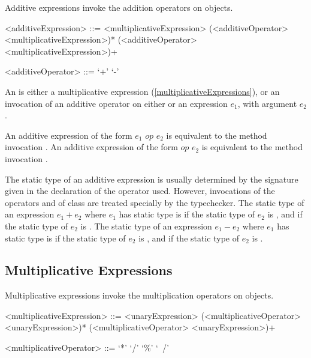 \documentclass[makeidx]{article}
\begin{document}
\LMHash{}%
Additive expressions invoke the addition operators on objects.

\begin{grammar}
<additiveExpression> ::= <multiplicativeExpression>
  \gnewline{} (<additiveOperator> <multiplicativeExpression>)*
  \alt \SUPER{} (<additiveOperator> <multiplicativeExpression>)+

<additiveOperator> ::= `+'
  \alt `-'
\end{grammar}

\LMHash{}%
An  is either a multiplicative expression (\ref{multiplicativeExpressions}), or an invocation of an additive operator on either \SUPER{} or an expression $e_1$, with argument $e_2$.

\LMHash{}%
An additive expression of the form $e_1$ $op$ $e_2$ is equivalent to the method invocation .
An additive expression of the form \SUPER{} $op$ $e_2$ is equivalent to the method invocation .

\LMHash{}%
The static type of an additive expression is usually determined by the signature given in the declaration of the operator used.
However, invocations of the operators \code{+} and \code{-} of class  are treated specially by the typechecker.
The static type of an expression $e_1 + e_2$ where $e_1$ has static type  is  if the static type of $e_2$ is , and  if the static type of $e_2$ is .
The static type of an expression $e_1 - e_2$ where $e_1$ has static type  is  if the static type of $e_2$ is , and  if the static type of $e_2$ is .


\subsection{Multiplicative Expressions}

\LMHash{}%
Multiplicative expressions invoke the multiplication operators on objects.

\begin{grammar}
<multiplicativeExpression> ::= \gnewline{}
  <unaryExpression> (<multiplicativeOperator> <unaryExpression>)*
  \alt \SUPER{} (<multiplicativeOperator> <unaryExpression>)+

<multiplicativeOperator> ::= `*'
  \alt `/'
  \alt `\%'
  \alt `~/'
\end{grammar}
\end{document}
